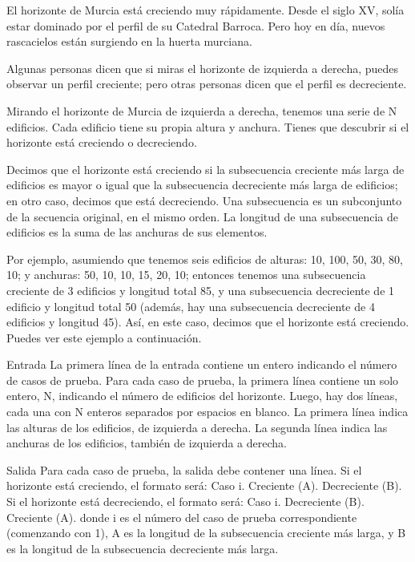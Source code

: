 El horizonte de Murcia está creciendo muy rápidamente. Desde el siglo XV, solía estar dominado por el perfil de su Catedral Barroca. Pero hoy en día, nuevos rascacielos están surgiendo en la huerta murciana. 

Algunas personas dicen que si miras el horizonte de izquierda a derecha, puedes observar un perfil creciente; pero otras personas dicen que el perfil es decreciente. 

Mirando el horizonte de Murcia de izquierda a derecha, tenemos una serie de N edificios. Cada edificio tiene su propia altura y anchura. Tienes que descubrir si el horizonte está creciendo o decreciendo. 

Decimos que el horizonte está creciendo si la subsecuencia creciente más larga de edificios es mayor o igual que la subsecuencia decreciente más larga de edificios; en otro caso, decimos que está decreciendo. Una subsecuencia es un subconjunto de la secuencia original, en el mismo orden. La longitud de una subsecuencia de edificios es la suma de las anchuras de sus elementos. 

Por ejemplo, asumiendo que tenemos seis edificios de alturas: 10, 100, 50, 30, 80, 10; y anchuras: 50, 10, 10, 15, 20, 10; entonces tenemos una subsecuencia creciente de 3 edificios y longitud total 85, y una subsecuencia decreciente de 1 edificio y longitud total 50 (además, hay una subsecuencia decreciente de 4 edificios y longitud 45). Así, en este caso, decimos que el horizonte está creciendo. Puedes ver este ejemplo a continuación. 

Entrada 
La primera línea de la entrada contiene un entero indicando el número de casos de prueba. Para cada caso de prueba, la primera línea contiene un solo entero, N, indicando el número de edificios del horizonte. Luego, hay dos líneas, cada una con N enteros separados por espacios en blanco. La primera línea indica las alturas de los edificios, de izquierda a derecha. La segunda línea indica las anchuras de los edificios, también de izquierda a derecha. 

Salida 
Para cada caso de prueba, la salida debe contener una línea. Si el horizonte está creciendo, el formato será: 
Caso i. Creciente (A). Decreciente (B). 
Si el horizonte está decreciendo, el formato será: 
Caso i. Decreciente (B). Creciente (A). 
donde i es el número del caso de prueba correspondiente (comenzando con 1), A es la longitud de la subsecuencia creciente más larga, y B es la longitud de la subsecuencia decreciente más larga. 


